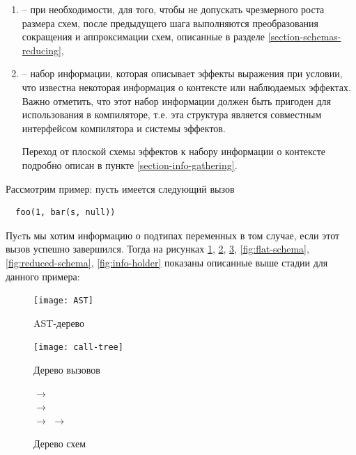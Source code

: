 \begin{enumerate}
  \item {} -- при необходимости, для того, чтобы не допускать чрезмерного роста размера схем, после предыдущего шага выполняются преобразования сокращения и аппроксимации схем, описанные в разделе \ref{section-schemas-reducing},

  \item {} -- набор информации, которая описывает эффекты выражения при условии, что известна некоторая информация о контексте или наблюдаемых эффектах. Важно отметить, что этот набор информации должен быть пригоден для использования в компиляторе, т.е. эта структура является совместным интерфейсом компилятора и системы эффектов.

  Переход от плоской схемы эффектов к набору информации о контексте подробно описан в пункте \ref{section-info-gathering}.
\end{enumerate}

Рассмотрим пример: пусть имеется следующий вызов

\begin{verbatim}
  foo(1, bar(s, null))
\end{verbatim}

Пуcть мы хотим информацию о подтипах переменных в том случае, если этот вызов успешно завершился. Тогда на рисунках \ref{fig:AST-tree}, \ref{fig:call-tree}, \ref{fig:schemas-tree}, \ref{fig:flat-schema}, \ref{fig:reduced-schema}, \ref{fig:info-holder} показаны описанные выше стадии для данного примера:

\begin{figure}[h]
  \texttt{[image: AST]}
  \caption{AST-дерево}
  \label{fig:AST-tree}
\end{figure}

\begin{figure}[h]
  \texttt{[image: call-tree]}
  \caption{Дерево вызовов}
  \label{fig:call-tree}
\end{figure}

\begin{figure}[h]
  {
     $\rightarrow$  \\

    {
       $\rightarrow$  \\
       $\rightarrow$ 
    }
    {
       $\rightarrow$ 
    }
  }
  {}

  \caption{Дерево схем}
  \label{fig:schemas-tree}
\end{figure}

